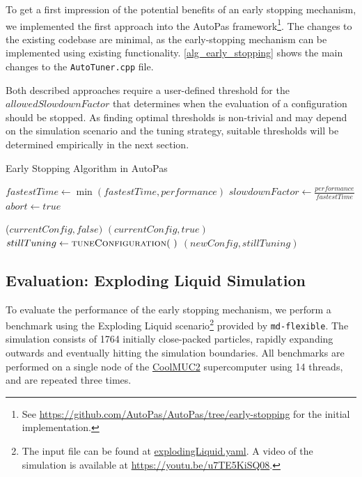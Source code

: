 \documentclass[conference]{IEEEtran}
\begin{document}
To get a first impression of the potential benefits of an early stopping mechanism, we implemented the first approach into the AutoPas framework\footnote{
    See \href{https://github.com/AutoPas/AutoPas/tree/early-stopping}{
        https://github.com/AutoPas/AutoPas/tree/early-stopping} for the initial implementation.
}. The changes to the existing codebase are minimal, as the early-stopping mechanism can be implemented using existing functionality. \autoref{alg_early_stopping} shows the main changes to the \texttt{AutoTuner.cpp} file.

Both described approaches require a user-defined threshold for the $allowedSlowdownFactor$ that determines when the evaluation of a configuration should be stopped. As finding optimal thresholds is non-trivial and may depend on the simulation scenario and the tuning strategy, suitable thresholds will be determined empirically in the next section.

\begin{algorithm}[h]
    \small
    \caption{Early Stopping Algorithm in AutoPas}
    \label{alg_early_stopping}
    \begin{algorithmic}[1]
        \State $fastestTime \gets \min(fastestTime, performance)$
        \State $slowdownFactor \gets \frac{performance}{fastestTime}$
        \State $abort \gets true$
        \EndIf
        \EndProcedure

        \vspace{0.5em}

        \State \Return ($currentConfig, false)$
            \State \Return $(currentConfig, true)$
            \Else
            \State $stillTuning \gets \Call{tuneConfiguration}{~}$
            \State \Return $(newConfig, stillTuning)$
        \EndIf
        \EndProcedure
    \end{algorithmic}
\end{algorithm}

\subsection{Evaluation: Exploding Liquid Simulation}
\label{sec:evaluation}

To evaluate the performance of the early stopping mechanism, we perform a benchmark using the Exploding Liquid scenario\footnote{
    The input file can be found at \href{
        https://github.com/AutoPas/AutoPas/blob/master/examples/md-flexible/input/explodingLiquid.yaml}{explodingLiquid.yaml}.
    A video of the simulation is available at \url{https://youtu.be/u7TE5KiSQ08}.
} provided by \texttt{md-flexible}. The simulation consists of 1764 initially close-packed particles, rapidly expanding outwards and eventually hitting the simulation boundaries. All benchmarks are performed on a single node of the \href{https://doku.lrz.de/coolmuc-2-11484376.html}{CoolMUC2} supercomputer using 14 threads, and are repeated three times.
\end{document}
